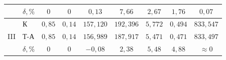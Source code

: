 \documentclass[14pt,oneside,final]{extreport}
\begin{document}
\begin{table}[]
{\begin{tabular}{|c|l|c|c|c|c|c|c|c|}
								   & $ \delta, \% $ & $ 0 $                                                                                        & $ 0 $                                                                               & $ 0,13 $	                                                                                       & $7,66    $                                                                                 & $2,67$                                                                                       & $1,76$                                                                                              & $0,07$                                                                                            \\ \hline
			\multirow{3}{*}{III}   & К              & $ 0,85 $                                                                                     & $ 0,14 $                                                                            & $ 157,120 $                                                                                     & $192,396 $                                                                                 & $5,772$                                                                                      & $0,494$                                                                                             & $ 833,547 $                                                                                       \\ \cline{2-9} 
								   & Т-А            & $ 0,85 $                                                                                     & $ 0,14 $                                                                            & $ 156,989 $                                                                                     & $187,917 $                                                                                 & $5,471$                                                                                      & $0,471$                                                                                             & $ 833,497 $                                                                                       \\ \cline{2-9} 
								   & $ \delta, \% $ & $ 0 $                                                                                        & $ 0 $                                                                               & $ -0,08 $                                                                                       & $2,38 $                                                                                    & $5,48$                                                                                       & $4,88$                                                                                              & $ \approx 0 $                                                                                     \\ \hline
		\end{tabular}
	}
	\end{table}
\end{document}
